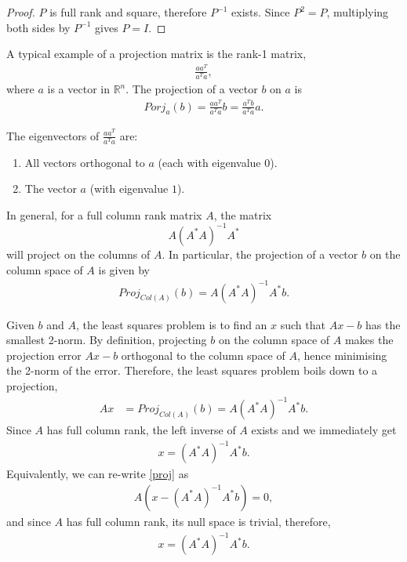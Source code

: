 \documentclass{amsart}
\theoremstyle{plain}
\numberwithin{equation}{section}
\begin{document}
\begin{proof}
$P$ is full rank and square, therefore $P^{-1}$ exists. Since $P^2=P$, multiplying both sides by $P^{-1} $ gives
$P=I$. 
\end{proof}
A typical example of a projection matrix is the 
rank-1 matrix,
\begin{align*}
\frac{aa^T}{a^Ta},
\end{align*}
where $a$ is a vector in $\mathbb{R}^n$. The projection of a 
vector $b$ on $a$ is
\begin{align*}
Porj_{a}(b) = \frac{aa^T}{a^Ta} b = \frac{a^Tb}{a^Ta} a.
\end{align*}

The eigenvectors of $\frac{aa^T}{a^Ta}$ are:
\begin{enumerate}
\item All vectors orthogonal to $a$ (each with eigenvalue $0$).
\item The vector $a$ (with eigenvalue $1$).
\end{enumerate}

In general, for a full column rank matrix $A$, the matrix
$$A(A^*A)^{-1}A^*$$ 
will project on the 
columns of $A$. In particular, the 
projection of a vector $b$ on the column space of $A$ is given 
by
\begin{align*}
Proj_{Col(A)}(b) = A(A^*A)^{-1}A^*b.
\end{align*}

Given $b$ and $A$, the least squares problem is to
find an $x$ such that $Ax-b$ has the smallest 2-norm.
By definition, projecting $b$ on the column space of $A$
makes the projection error $Ax-b$ orthogonal to the column 
space of $A$, hence minimising the 2-norm of the 
error. Therefore, the least squares problem boils down to
a projection,
\begin{align}
Ax &= Proj_{Col(A)}(b)= A(A^*A)^{-1}A^*b.
\label{proj}
\end{align}
Since $A$ has full column rank, the left inverse of $A$ exists and 
we immediately get 
\begin{align*}
x = (A^*A)^{-1}A^*b.
\end{align*}
Equivalently, we can re-write \eqref{proj} as 
\begin{align*}
A\left(x - (A^*A)^{-1}A^*b\right) = 0,
\end{align*}
and since $A$ has full column rank, its null space is trivial,
therefore,
\begin{align*}
x = (A^*A)^{-1}A^*b.
\end{align*}
\end{document}
